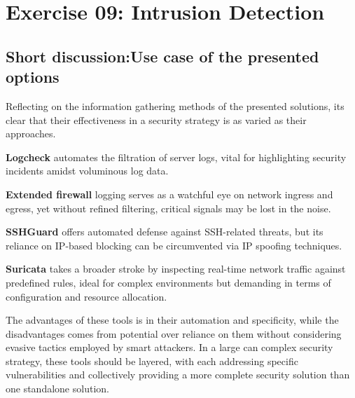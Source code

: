 \section{Exercise 09: Intrusion Detection}

\subsection{Short discussion:Use case of the presented options}
Reflecting on the information gathering methods of the presented solutions, its clear that their effectiveness in a security strategy is as varied as their approaches.

\textbf{Logcheck} automates the filtration of server logs, vital for highlighting security incidents amidst voluminous log data.

\textbf{Extended firewall} logging serves as a watchful eye on network ingress and egress, yet without refined filtering, critical signals may be lost in the noise.

\textbf{SSHGuard} offers automated defense against SSH-related threats, but its reliance on IP-based blocking can be circumvented via IP spoofing techniques.

\textbf{Suricata} takes a broader stroke by inspecting real-time network traffic against predefined rules,
ideal for complex environments but demanding in terms of configuration and resource allocation.

The advantages of these tools is in their automation and specificity, while the disadvantages comes from potential over reliance on them without considering
evasive tactics employed by smart attackers. In a large can complex security strategy, these tools should be layered,
with each addressing specific vulnerabilities and collectively providing a more complete security solution than one standalone solution.